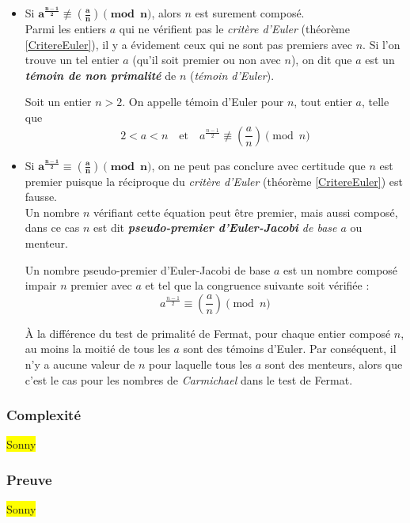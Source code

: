 		\begin{itemize}
		\item Si $\mathbf{a^{\frac{n-1}{2}} \not\equiv \left ( \frac{a}{n} \right ) \pmod n}$, alors $n$ est surement composé.\\
		Parmi les entiers $a$ qui ne vérifient pas le \textit{critère d'Euler} (théorème \ref{CritereEuler}), il y a évidement ceux qui ne sont pas premiers avec $n$. Si l'on trouve un tel entier $a$ (qu'il soit premier ou non avec $n$), on dit que $a$ est un \textit{\textbf{témoin de non primalité}} de $n$ (\textit{témoin d'Euler}).
			
			\vspace{-1.5em}\begin{adjustwidth}{1.5cm}{1.5cm} 
			\begin{Def}
			\label{TemEuler}
				Soit un entier $n > 2$. On appelle témoin d'Euler pour $n$, tout entier $a$, telle que
				\[2 < a < n  \quad \text{et} \quad a^{\frac{n-1}{2}} \not\equiv \left ( \frac{a}{n} \right ) \pmod n\]
			\end{Def}
			\end{adjustwidth}\vspace{0.5em}
		
		\item Si $\mathbf{a^{\frac{n-1}{2}} \equiv \left ( \frac{a}{n} \right ) \pmod n}$, on ne peut pas conclure avec certitude que $n$ est premier puisque la réciproque du \textit{critère d'Euler} (théorème \ref{CritereEuler}) est fausse.\\
		Un nombre $n$ vérifiant cette équation peut être premier, mais aussi composé, dans ce cas $n$ est dit \textit{\textbf{pseudo-premier d'Euler-Jacobi} de base $a$} ou menteur.
					
			\vspace{-1.5em}\begin{adjustwidth}{1.5cm}{1.5cm} 
			\begin{Def}
				\label{PseudoPremEulerJ}
				Un nombre pseudo-premier d'Euler-Jacobi de base $a$ est un nombre composé impair $n$ premier avec $a$ et tel que la congruence suivante soit vérifiée :
				\[a^{\frac{n-1}{2}} \equiv \left ( \frac{a}{n} \right ) \pmod n\]
			\end{Def}
			\end{adjustwidth}\vspace{0.5em}
			
		À la différence du test de primalité de Fermat, pour chaque entier composé $n$, au moins la moitié de tous les $a$ sont des témoins d’Euler. Par conséquent, il n’y a aucune valeur de $n$ pour laquelle tous les $a$ sont des menteurs, alors que c'est le cas pour les nombres de \textit{Carmichael} dans le test de Fermat.
		\end{itemize}
	
	
	\subsubsection{Complexité}
		\colorbox{yellow}{Sonny}
		
	\subsubsection{Preuve}
		\colorbox{yellow}{Sonny}
